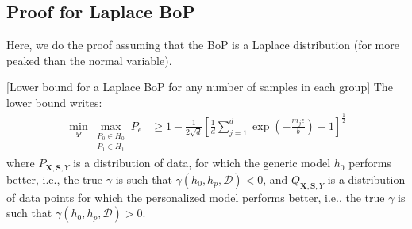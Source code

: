 \subsection{Proof for Laplace BoP}\label{sec:proof-real-valued-laplace}
Here, we do the proof assuming that the BoP is a Laplace distribution (for more peaked than the normal variable).
\begin{corollary}
\label{cor:lower_bound_laplace}
[Lower bound for a Laplace BoP for any number of samples in each group]
The lower bound writes:
\
\begin{align*} 
\min _{\Psi} 
    \max _{\substack{P_0 \in H_0 \\ P_1 \in H_1}}
        P_e 
        &\geq  1 - \frac{1}{2\sqrt{d}}\left[
             \frac{1}{d}
            \sum_{j=1}^d 
            \exp\left(-\frac{m_j\epsilon }{b} \right)
            -1
            \right]^{\frac{1}{2}}
\end{align*}
where $P_{\mathbf{X}, \mathbf{S}, Y}$ is a distribution of data, for which the generic model $h_0$ performs better, i.e., the true $\gamma$ is such that $\gamma(h_0, h_p, \mathcal{D}) < 0$, and $Q_{\mathbf{X}, \mathbf{S}, Y}$ is a distribution of data points for which the personalized model performs better, i.e., the true $\gamma$ is such that $\gamma(h_0, h_p, \mathcal{D}) > 0$.
\end{corollary}

